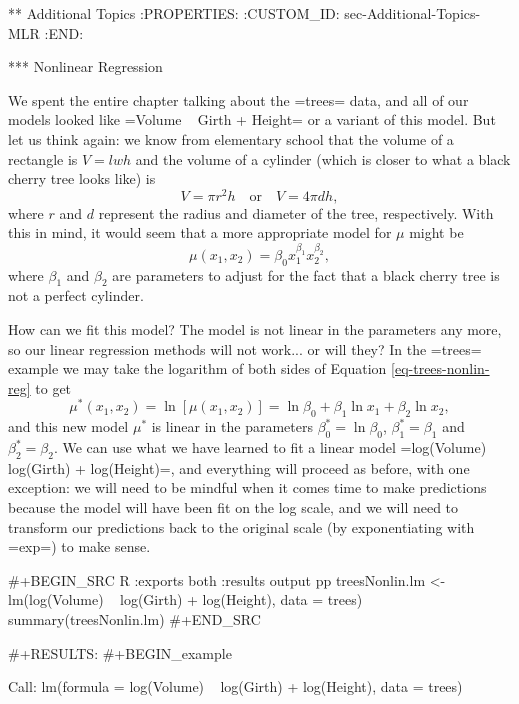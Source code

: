 ** Additional Topics
:PROPERTIES:
:CUSTOM_ID: sec-Additional-Topics-MLR
:END:

*** Nonlinear Regression

We spent the entire chapter talking about the =trees= data, and all of
our models looked like =Volume ~ Girth + Height= or a variant of this
model. But let us think again: we know from elementary school that the
volume of a rectangle is \(V=lwh\) and the volume of a cylinder (which
is closer to what a black cherry tree looks like) is
\begin{equation}
V=\pi r^{2}h\quad \mbox{or}\quad V=4\pi dh,
\end{equation}
where \(r\) and \(d\) represent the radius and diameter of the tree,
respectively. With this in mind, it would seem that a more appropriate
model for \(\mu\) might be
\begin{equation}
\label{eq-trees-nonlin-reg}
\mu(x_{1},x_{2})=\beta_{0}x_{1}^{\beta_{1}}x_{2}^{\beta_{2}},
\end{equation}
where \(\beta_{1}\) and \(\beta_{2}\) are parameters to adjust for the
fact that a black cherry tree is not a perfect cylinder.

How can we fit this model? The model is not linear in the parameters
any more, so our linear regression methods will not work... or will
they? In the =trees= example we may take the logarithm of both sides
of Equation \eqref{eq-trees-nonlin-reg} to get
\begin{equation}
\mu^{\ast}(x_{1},x_{2})=\ln\left[\mu(x_{1},x_{2})\right]=\ln\beta_{0}+\beta_{1}\ln x_{1}+\beta_{2}\ln x_{2},
\end{equation}
and this new model \(\mu^{\ast}\) is linear in the parameters
\(\beta_{0}^{\ast}=\ln\beta_{0}\), \(\beta_{1}^{\ast}=\beta_{1}\) and
\(\beta_{2}^{\ast}=\beta_{2}\). We can use what we have learned to fit
a linear model =log(Volume) ~ log(Girth) + log(Height)=, and
everything will proceed as before, with one exception: we will need to
be mindful when it comes time to make predictions because the model
will have been fit on the log scale, and we will need to transform our
predictions back to the original scale (by exponentiating with =exp=)
to make sense.

#+BEGIN_SRC R :exports both :results output pp 
treesNonlin.lm <- lm(log(Volume) ~ log(Girth) + log(Height), data = trees)
summary(treesNonlin.lm)
#+END_SRC

#+RESULTS:
#+BEGIN_example

Call:
lm(formula = log(Volume) ~ log(Girth) + log(Height), data = trees)

